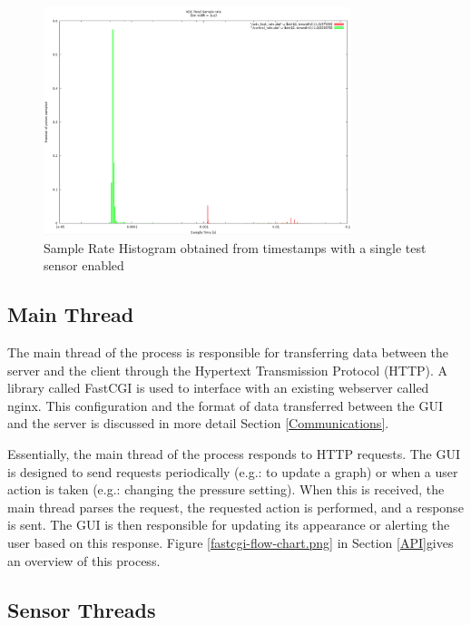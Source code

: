 \begin{figure}[H]
	\centering
	\includegraphics[width=0.8\textwidth]{figures/sample_rate_histogram.png}
	\caption{Sample Rate Histogram obtained from timestamps with a single test sensor enabled}
	\label{sample_rate_histogram.png}
\end{figure}


\subsection{Main Thread}\label{Main Thread}

The main thread of the process is responsible for transferring data between the server and the client through the Hypertext Transmission Protocol (HTTP). A library called FastCGI is used to interface with an existing webserver called nginx\cite{nginx}. This configuration and the format of data transferred between the GUI and the server is discussed in more detail Section \ref{Communications}.

Essentially, the main thread of the process responds to HTTP requests. The GUI is designed to send requests periodically (e.g.: to update a graph) or when a user action is taken (e.g.: changing the pressure setting). When this is received, the main thread parses the request, the requested action is performed, and a response is sent. The GUI is then responsible for updating its appearance or alerting the user based on this response. Figure \ref{fastcgi-flow-chart.png} in Section \ref{API}gives an overview of this process.


\subsection{Sensor Threads}\label{Sensor Thread}

